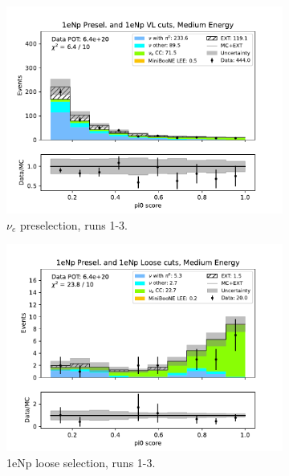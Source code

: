 \begin{figure}[H]
    \centering
    \begin{subfigure}{0.33\linewidth}
        \includegraphics[width=\linewidth]{technote/Sidebands/Figures/NearSideband/near_sideband_pi0_score_run123_NP_NP_MEDIUM_ENERGY.pdf}
        \caption{$\nu_e$ preselection, runs 1-3.}
    \end{subfigure}%
    \begin{subfigure}{0.33\linewidth}
        \includegraphics[width=\linewidth]{technote/Sidebands/Figures/NearSideband/near_sideband_pi0_score_run123_NP_NPL_MEDIUM_ENERGY.pdf}
        \caption{1eNp loose selection, runs 1-3.}
    \end{subfigure}%
    \begin{subfigure}{0.33\linewidth}

\end{subfigure}
\end{figure}
